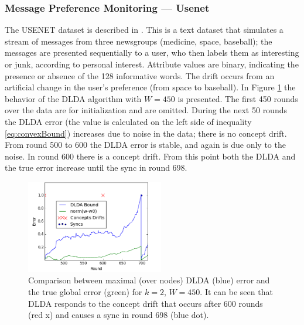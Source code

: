 \documentclass{sig-alternate-05-2015}
\begin{document}
\subsubsection{Message Preference Monitoring --- Usenet}
The USENET dataset is described in \cite{usenet}.
This is a text dataset that simulates a stream of messages from three newsgroups
(medicine, space, baseball); the messages are presented sequentially to a user, 
who then labels them as interesting or junk, according to personal interest. 
Attribute values are binary, indicating the presence or absence of the 128
informative words. The drift occurs from an artificial change in the user's
preference (from space to baseball). In Figure \ref{usenet} the behavior of the
DLDA algorithm with $W=450$ is presented. The first 450 rounds over the data are for
initialization and are omitted. During the next 50 rounds the DLDA error 
(the value is calculated on the left side of inequality
\ref{eq:convexBound}) increases due to noise in the data; there is
no concept drift. From round 500 to 600 the DLDA error is stable, 
and again is due only to the noise. In round 600 there is a concept 
drift.
From this point both the DLDA and the true error increase until the 
sync in round 698.

\begin{figure}[h]
	\centering
	\includegraphics[width=60mm]{Usenet/DriftDetected.png}
	\caption{Comparison between maximal (over nodes) DLDA (blue) 
	error and the true global error (green) for $k=2$, $W=450$. 
	It can be seen that DLDA responds to the concept drift that occurs 
	after 600 rounds (red x) and causes a sync in round 698 (blue dot).}
	\label{usenet}
	\end{figure}
	
\end{document}
